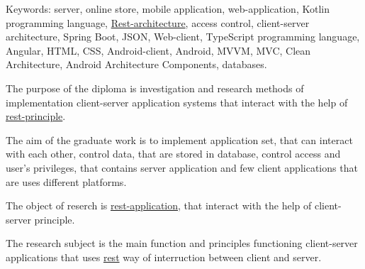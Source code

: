Keywords: server, online store, mobile application, web-application, Kotlin programming language, \hyperlink{gloss:rest}{Rest-architecture}, 
access control, client-server architecture, Spring Boot, JSON, Web-client, TypeScript programming language, Angular, HTML, CSS, Android-client, 
Android, MVVM, MVC, Clean Architecture, Android Architecture Components, databases.

The purpose of the diploma is investigation and research methods of implementation client-server application systems that interact with the help of \hyperlink{gloss:rest}{rest-principle}.

The aim of the graduate work is to implement application set, that can interact with each other, 
control data, that are stored in database, control access and user's privileges, 
that contains server application and few client applications that are uses different platforms.

The object of reserch is \hyperlink{gloss:rest}{rest-application}, that interact with the help of client-server principle.

The research subject is the main function and principles functioning client-server applications that uses \hyperlink{gloss:rest}{rest} way of interruction between client and server.